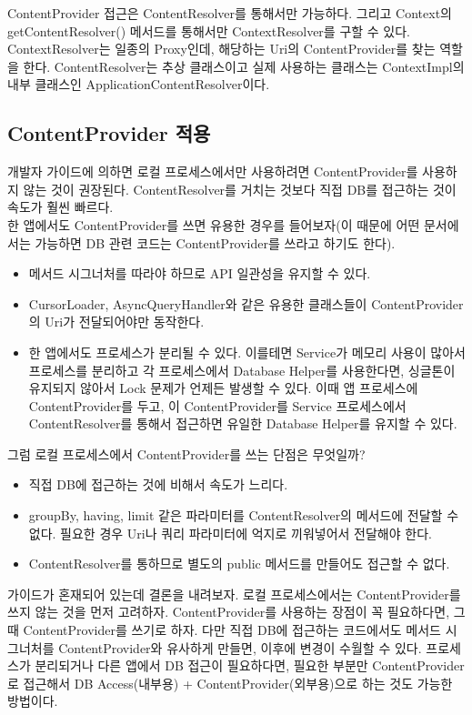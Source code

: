 ContentProvider 접근은 ContentResolver를 통해서만 가능하다. 그리고 Context의 getContentResolver() 메서드를 통해서만 ContextResolver를 구할 수 있다.  
ContextResolver는 일종의 Proxy인데, 해당하는 Uri의 ContentProvider를 찾는 역할을 한다.
ContentResolver는 추상 클래스이고 실제 사용하는 클래스는 ContextImpl의 내부 클래스인 ApplicationContentResolver이다.

\subsection{ContentProvider 적용}
개발자 가이드에 의하면 로컬 프로세스에서만 사용하려면 ContentProvider를 사용하지 않는 것이 권장된다. 
ContentResolver를 거치는 것보다 직접 DB를 접근하는 것이 속도가 훨씬 빠르다.\\

한 앱에서도 ContentProvider를 쓰면 유용한 경우를 들어보자(이 때문에 어떤 문서에서는 가능하면 DB 관련 코드는 ContentProvider를 쓰라고 하기도 한다).
\begin{itemize}
\item 메서드 시그너처를 따라야 하므로 API 일관성을 유지할 수 있다.
\item CursorLoader, AsyncQueryHandler와 같은 유용한 클래스들이 ContentProvider의 Uri가 전달되어야만 동작한다.
\item 한 앱에서도 프로세스가 분리될 수 있다. 이를테면 Service가 메모리 사용이 많아서 프로세스를 분리하고 각 프로세스에서 Database Helper를 사용한다면, 싱글톤이 유지되지 않아서 Lock 문제가 언제든 발생할 수 있다.
이때 앱 프로세스에 ContentProvider를 두고, 이 ContentProvider를 Service 프로세스에서 ContentResolver를 통해서 접근하면 유일한 Database Helper를 유지할 수 있다. %
\end {itemize}

그럼 로컬 프로세스에서 ContentProvider를 쓰는 단점은 무엇일까?
\begin{itemize}
\item 직접 DB에 접근하는 것에 비해서 속도가 느리다.
\item groupBy, having, limit 같은 파라미터를 ContentResolver의 메서드에 전달할 수 없다. 
필요한 경우 Uri나 쿼리 파라미터에 억지로 끼워넣어서 전달해야 한다. 
\item ContentResolver를 통하므로 별도의 public 메서드를 만들어도 접근할 수 없다.
\end {itemize}

가이드가 혼재되어 있는데 결론을 내려보자.
로컬 프로세스에서는 ContentProvider를 쓰지 않는 것을 먼저 고려하자. ContentProvider를 사용하는 장점이 꼭 필요하다면, 그때 ContentProvider를 쓰기로 하자.
다만 직접 DB에 접근하는 코드에서도 메서드 시그너처를 ContentProvider와 유사하게 만들면, 이후에 변경이 수월할 수 있다.
프로세스가 분리되거나 다른 앱에서 DB 접근이 필요하다면, 필요한 부분만 ContentProvider로 접근해서 DB Access(내부용) + ContentProvider(외부용)으로 하는 것도 가능한 방법이다.\\

